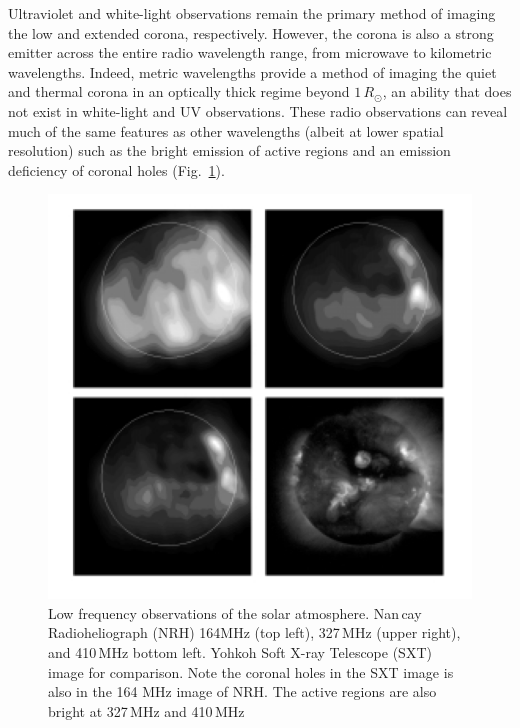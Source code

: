 Ultraviolet and white-light observations remain the primary method of imaging the low and extended corona, respectively. However, the corona is also a strong emitter across the entire radio wavelength range, from microwave to kilometric wavelengths. Indeed, metric wavelengths provide a method of imaging the quiet and thermal corona in an optically thick regime beyond $1\,R_{\odot}$, an ability that does not exist in white-light and UV observations. These radio observations can reveal much of the same features as other wavelengths (albeit at lower spatial resolution) such as the bright emission of active regions and an emission deficiency of coronal holes (Fig.~\ref{fig:lowfreq}).
\begin{figure}[t!]
\begin{center}
\includegraphics[scale=0.6, trim=0cm 1cm 0cm 1cm]{images/low_freq_obs}
\caption[Comparison of soft X-ray and low frequency radio observations of the corona]{Low frequency observations of the solar atmosphere. Nan\,{c}ay Radioheliograph (NRH) 164MHz (top left), 327\,MHz (upper right), and 410\,MHz bottom left. Yohkoh Soft X-ray Telescope (SXT) image for comparison. Note the coronal holes in the SXT image is also in the 164 MHz image of NRH. The active regions are also bright at 327\,MHz and 410\,MHz \citep{lantos1999}}
\label{fig:lowfreq}
\end{center}
\end{figure}

